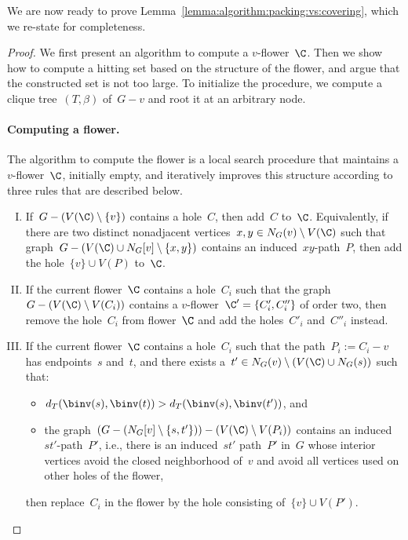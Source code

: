 We are now ready to prove Lemma~\ref{lemma:algorithm:packing:vs:covering}, which we re-state for completeness.

\begin{lemma*}
\erdosposa
\end{lemma*}
\begin{proof}
We first present an algorithm to compute a $v$-flower~$\C$. Then we show how to compute a hitting set based on the structure of the flower, and argue that the constructed set is not too large. To initialize the procedure, we compute a clique tree~$(T,\beta)$ of~$G - v$ and root it at an arbitrary node.

\paragraph{Computing a flower.} The algorithm to compute the flower is a local search procedure that maintains a $v$-flower~$\C$, initially empty, and iteratively improves this structure according to three rules that are described below.

\begin{enumerate}[(I)]
	\item If~$G - (V(\C) \setminus \{v\})$ contains a hole~$C$, then add~$C$ to~$\C$. Equivalently, if there are two distinct nonadjacent vertices~$x,y \in N_G(v) \setminus V(\C)$ such that graph~$G - (V(\C) \cup N_G[v] \setminus \{x,y\})$ contains an induced~$xy$-path~$P$, then add the hole~$\{v\} \cup V(P)$ to~$\C$.\label{improve:addpath}
	\item If the current flower~$\C$ contains a hole~$C_i$ such that the graph~$G - (V(\C) \setminus V(C_i))$ contains a $v$-flower~$\C' = \{C'_i, C''_i\}$ of order two, then remove the hole~$C_i$ from flower~$\C$ and add the holes~$C'_i$ and~$C''_i$ instead.\label{improve:addtwoflower}
	\item If the current flower~$\C$ contains a hole~$C_i$ such that the path~$P_i := C_i - v$ has endpoints~$s$ and~$t$, and there exists a~$t' \in N_G(v) \setminus (V(\C) \cup N_G(s))$ such that:
	\begin{itemize}
		\item $d_T(\binv(s), \binv(t)) > d_T(\binv(s), \binv(t'))$, and
		\item the graph~$(G - (N_G[v] \setminus \{s,t'\})) - (V(\C) \setminus V(P_i))$ contains an induced~$st'$-path~$P'$, i.e., there is an induced~$st'$ path~$P'$ in~$G$ whose interior vertices avoid the closed neighborhood of~$v$ and avoid all vertices used on other holes of the flower,
	\end{itemize}
	then replace~$C_i$ in the flower by the hole consisting of~$\{v\} \cup V(P')$.\label{improve:shorten}
\end{enumerate}


\end{proof}
